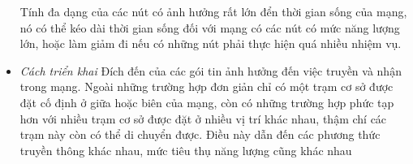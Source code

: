 \documentclass{article}
\begin{document}
\begin{itemize}
\newline Tính đa dạng của các nút có ảnh hưởng rất lớn đển thời gian sống của mạng, nó có thể kéo dài thời gian sống đối với mạng có các nút có mức năng lượng lớn, hoặc làm giảm đi nếu có những nút phải thực hiện quá nhiều nhiệm vụ.
    \item \emph{Cách triển khai}
    \newline Đích đến của các gói tin ảnh hưởng đến việc truyền và nhận trong mạng. Ngoài những trường hợp đơn giản chỉ có một trạm cơ sở được đặt cố định ở giữa hoặc biên của mạng, còn có những trường hợp phức tạp hơn với nhiều trạm cơ sở được đặt ở nhiều vị trí khác nhau, thậm chí các trạm này còn có thể di chuyển được. Điều này dẫn đến các phương thức truyền thông khác nhau, mức tiêu thụ năng lượng cũng khác nhau
\end{itemize}
\end{document}
